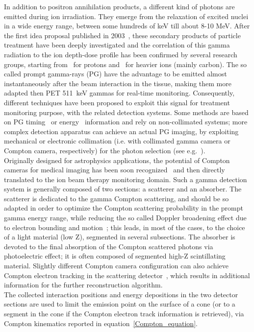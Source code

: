 In addition to positron annihilation products, a different kind of photons are emitted during ion irradiation. They emerge from the relaxation of excited nuclei in a wide energy range, between some hundreds of keV till about 8-10 MeV. After the first idea proposal published in 2003~\cite{PG_first}, these secondary products of particle treatment have been deeply investigated and the correlation of this gamma radiation to the ion depth-dose profile has been confirmed by several research groups, starting from~\cite{Min_PG} for protons and~\cite{Testa_PG} for heavier ions (mainly carbon). The so called prompt gamma-rays (PG) have the advantage to be emitted almost instantaneously after the beam interaction in the tissue, making them more adapted then PET 511~keV gammas for real-time monitoring. Consequently, different techniques have been proposed to exploit this signal for treatment monitoring purpose, with the related detection systems. Some methods are based on PG timing~\cite{Golnik:2014aa, Krimmer_PGPI} or energy~\cite{Verburg:2014aa} information and rely on non-collimated systems; more complex detection apparatus can achieve an actual PG imaging, by exploiting mechanical or electronic collimation (i.e. with collimated gamma camera or Compton camera, respectively) for the photon selection (see e.g.~\cite{Min_PG, Bom_collimated, Smeets:2012aa, Roellinghoff_2014, Priegnitz:2015aa, Frandes_2010, LLOSA2012105, KORMOLL2011114, MCCLESKEY2015163, Matsuoka:2014qna, Peterson:2010aa, Solevi:2016aa, ALDAWOOD2017190}).\\
Originally designed for astrophysics applications, the potential of Compton cameras for medical imaging has been soon recognized~\cite{TODD:1974aa} and then directly translated to the ion beam therapy monitoring domain. Such a gamma detection system is generally  composed of two sections: a scatterer and an absorber. The scatterer is dedicated to the gamma Compton scattering, and should be so adapted in order to optimize the Compton scattering probability in the prompt gamma energy range, while reducing the so called Doppler broadening effect due to electron bounding and motion~\cite{Doppler}; this leads, in most of the cases, to the choice of a light material (low Z), segmented in several subsections. The absorber is devoted to the final absorption of the Compton scattered photons via photoelectric effect; it is often composed of segmented high-Z scintillating material. Slightly different Compton camera configuration can also achieve Compton electron tracking in the scattering detector~\cite{Frandes_2010, Yoshihara_ETCC}, which results in additional information for the further reconstruction algorithm.\\ The collected interaction positions and energy depositions in the two detector sections are used to limit the emission point on the surface of a cone (or to a segment in the cone if the Compton electron track information is retrieved), via Compton kinematics reported in equation~\ref{Compton_equation}.
